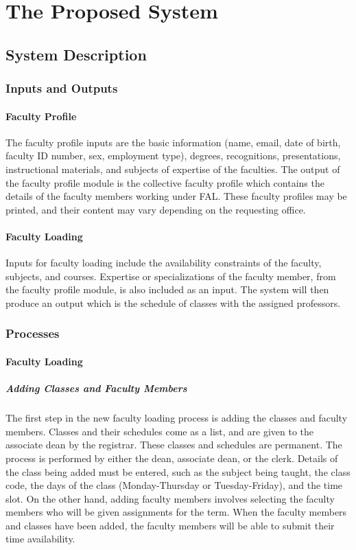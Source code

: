 \chapter{The Proposed System}

\section{System Description}

\subsection{Inputs and Outputs}

\subsubsection{Faculty Profile}
The faculty profile inputs are the basic information (name, email, date of birth, faculty ID number, sex, employment type), degrees, recognitions, presentations, instructional materials, and subjects of expertise of the faculties. The output of the faculty profile module is the collective faculty profile which contains the details of the faculty members working under FAL. These faculty profiles may be printed, and their content may vary depending on the requesting office.

\subsubsection{Faculty Loading}
Inputs for faculty loading include the availability constraints of the faculty, subjects, and courses. Expertise or specializations of the faculty member, from the faculty profile module, is also included as an input. The system will then produce an output which is the schedule of classes with the assigned professors.

\subsection{Processes}

    \subsubsection{Faculty Loading}
        \paragraph{Adding Classes and Faculty Members}
        The first step in the new faculty loading process is adding the classes and faculty members. Classes and their schedules come as a list, and are given to the associate dean by the registrar. These classes and schedules are permanent. The process is performed by either the dean, associate dean, or the clerk. Details of the class being added must be entered, such as the subject being taught, the class code, the days of the class (Monday-Thursday or Tuesday-Friday), and the time slot. On the other hand, adding faculty members involves selecting the faculty members who will be given assignments for the term. When the faculty members and classes have been added, the faculty members will be able to submit their time availability.
        

